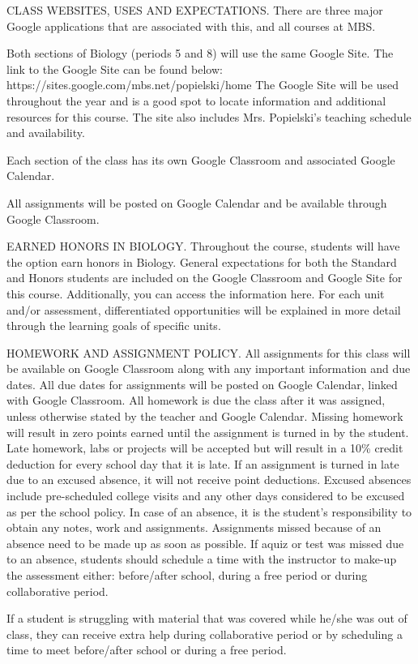 \documentclass{article}
\begin{document}
CLASS WEBSITES, USES AND EXPECTATIONS.
There are three major Google applications that are associated with this, and all courses at MBS.

Both sections of Biology (periods 5 and 8) will use the same Google Site. The link to the Google Site can be found below:
  https://sites.google.com/mbs.net/popielski/home
  The Google Site will be used throughout the year and is a good spot to locate information and additional resources for this course.
  The site also includes Mrs. Popielski’s teaching schedule and availability.

Each section of the class has its own Google Classroom and associated Google Calendar.

All assignments will be posted on Google Calendar and be available through Google Classroom.

EARNED HONORS IN BIOLOGY.
Throughout the course, students will have the option earn honors in Biology. General expectations for both the Standard and Honors students are included on the Google Classroom and Google Site for this course. Additionally, you can access the information here. For each unit and/or assessment, differentiated opportunities will be explained in more detail through the learning goals of specific units.

HOMEWORK AND ASSIGNMENT POLICY.
All assignments for this class will be available on Google Classroom along with any important information and due dates.
All due dates for assignments will be posted on Google Calendar, linked with Google Classroom.
All homework is due the class after it was assigned, unless otherwise stated by the teacher and Google Calendar.
Missing homework will result in zero points earned until the assignment is turned in by the student.
Late homework, labs or projects will be accepted but will result in a 10\% credit deduction for every school day that it is late.
If an assignment is turned in late due to an excused absence, it will not receive point deductions.
Excused absences include pre-scheduled college visits and any other days considered to be excused as per the school policy.
In case of an absence, it is the student’s responsibility to obtain any notes, work and assignments.
Assignments missed because of an absence need to be made up as soon as possible. If aquiz or test was missed due to an absence, students should schedule a time with the instructor to make-up the assessment either: before/after school, during a free period or during collaborative period.

If a student is struggling with material that was covered while he/she was out of class, they can receive extra help during collaborative period or by scheduling a time to meet before/after school or during a free period.
\end{document}
